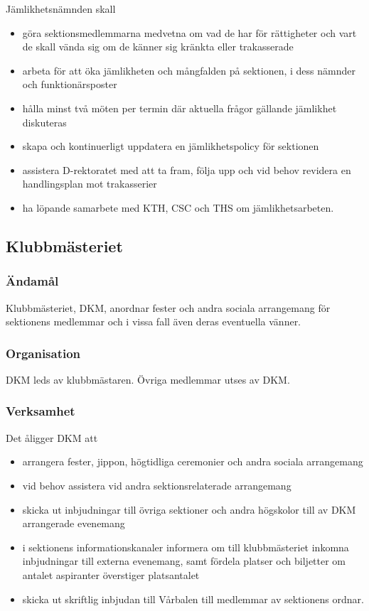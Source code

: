 \documentclass{dgovdoc}
\begin{document}
Jämlikhetsnämnden skall

\begin{itemize}
  \item göra sektionsmedlemmarna medvetna om vad de har för rättigheter och
    vart de skall vända sig om de känner sig kränkta eller trakasserade
  \item arbeta för att öka jämlikheten och mångfalden på sektionen, i dess
    nämnder och funktionärsposter
  \item hålla minst två möten per termin där aktuella frågor gällande jämlikhet
    diskuteras
  \item skapa och kontinuerligt uppdatera en jämlikhetspolicy för sektionen
  \item assistera D-rektoratet med att ta fram, följa upp och vid behov
    revidera en handlingsplan mot trakasserier
  \item ha löpande samarbete med KTH, CSC och THS om jämlikhetsarbeten.
\end{itemize}

\subsection{Klubbmästeriet}

\subsubsection{Ändamål}

Klubbmästeriet, DKM, anordnar fester och andra sociala arrangemang för
sektionens medlemmar och i vissa fall även deras eventuella vänner.

\subsubsection{Organisation}

DKM leds av klubbmästaren. Övriga medlemmar utses av DKM.

\subsubsection{Verksamhet}

Det åligger DKM att

\begin{itemize}
  \item arrangera fester, jippon, högtidliga ceremonier och andra sociala
    arrangemang
  \item vid behov assistera vid andra sektionsrelaterade arrangemang
  \item skicka ut inbjudningar till övriga sektioner och andra högskolor till
    av DKM arrangerade evenemang
  \item i sektionens informationskanaler informera om till klubbmästeriet
    inkomna inbjudningar till externa evenemang, samt fördela platser och
    biljetter om antalet aspiranter överstiger platsantalet
  \item skicka ut skriftlig inbjudan till Vårbalen till medlemmar av sektionens
    ordnar.
\end{itemize}
\end{document}
